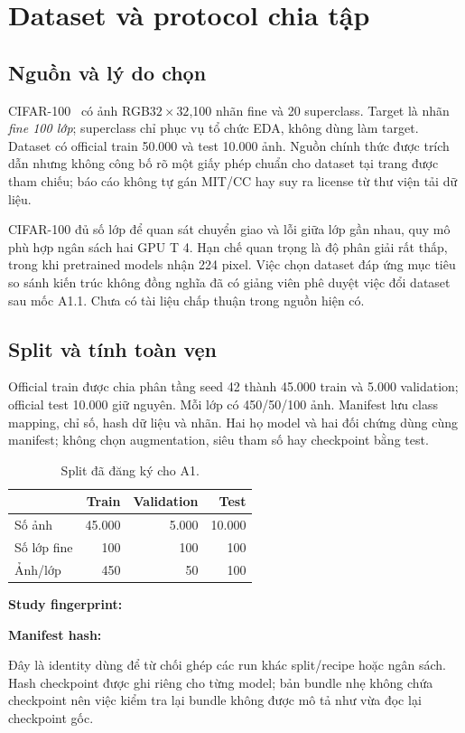 \documentclass[11pt,a4paper]{article}
\begin{document}
\section{Dataset và protocol chia tập}\label{sec:data}
\subsection{Nguồn và lý do chọn}
CIFAR-100~\cite{cifar} có ảnh RGB$32\times 32$,100 nhãn fine và 20 superclass. Target là nhãn \emph{fine 100 lớp}; superclass chỉ phục vụ tổ chức EDA, không dùng làm target. Dataset có official train 50.000 và test 10.000 ảnh. Nguồn chính thức được trích dẫn nhưng không công bố rõ một giấy phép chuẩn cho dataset tại trang được tham chiếu; báo cáo không tự gán MIT/CC hay suy ra license từ thư viện tải dữ liệu.

CIFAR-100 đủ số lớp để quan sát chuyển giao và lỗi giữa lớp gần nhau, quy mô phù hợp ngân sách hai GPU T 4. Hạn chế quan trọng là độ phân giải rất thấp, trong khi pretrained models nhận 224 pixel. Việc chọn dataset đáp ứng mục tiêu so sánh kiến trúc không đồng nghĩa đã có giảng viên phê duyệt việc đổi dataset sau mốc A1.1. Chưa có tài liệu chấp thuận trong nguồn hiện có.

\subsection{Split và tính toàn vẹn}
Official train được chia phân tầng seed 42 thành 45.000 train và 5.000 validation; official test 10.000 giữ nguyên. Mỗi lớp có 450/50/100 ảnh. Manifest lưu class mapping, chỉ số, hash dữ liệu và nhãn. Hai họ model và hai đối chứng dùng cùng manifest; không chọn augmentation, siêu tham số hay checkpoint bằng test.

\begin{table}[htbp]\centering\caption{Split đã đăng ký cho A1.}
\begin{tabular}{lrrr}\toprule & Train & Validation & Test\\\midrule
Số ảnh &45.000&5.000&10.000\\
Số lớp fine &100&100&100\\
Ảnh/lớp &450&50&100\\\bottomrule\end{tabular}\end{table}

\noindent\textbf{Study fingerprint:}\par
{\footnotesize{}}\par
\noindent\textbf{Manifest hash:}\par
{\footnotesize{}}\par
Đây là identity dùng để từ chối ghép các run khác split/recipe hoặc ngân sách. Hash checkpoint được ghi riêng cho từng model; bản bundle nhẹ không chứa checkpoint nên việc kiểm tra lại bundle không được mô tả như vừa đọc lại checkpoint gốc.
\clearpage
\end{document}
